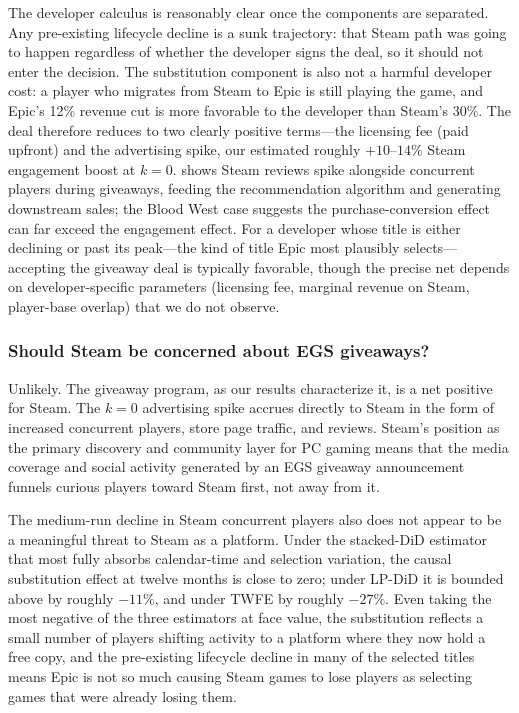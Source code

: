 \documentclass[11pt]{article}
\begin{document}
The developer calculus is reasonably clear once the components are separated.
Any pre-existing lifecycle decline is a sunk trajectory: that Steam path was
going to happen regardless of whether the developer signs the deal, so it
should not enter the decision. The substitution component is also not a
harmful developer cost: a player who migrates from Steam to Epic
is still playing the game, and Epic's 12\% revenue cut is more favorable to
the developer than Steam's 30\%. The deal therefore reduces to two clearly
positive terms---the licensing fee (paid upfront) and the advertising spike,
our estimated roughly $+10$--$14\%$ Steam engagement boost at $k = 0$. 
\citet{clarkson2025} shows Steam
reviews spike alongside concurrent players during giveaways, feeding the
recommendation algorithm and generating downstream sales; the Blood West case
\citep{frvr2026} suggests the purchase-conversion effect can far exceed the
engagement effect. For a developer whose title is either declining or past its
peak---the kind of title Epic most plausibly selects---accepting the giveaway
deal is typically favorable, though the precise net depends on developer-specific
parameters (licensing fee, marginal revenue on Steam, player-base overlap) that
we do not observe.

\subsubsection*{Should Steam be concerned about EGS giveaways?}

Unlikely. The giveaway program, as our results characterize it, is a net positive
for Steam. The $k = 0$ advertising spike accrues directly to Steam in the
form of increased concurrent players, store page traffic, and reviews. Steam's
position as the primary discovery and community layer for PC gaming means that
the media coverage and social activity generated by an EGS giveaway
announcement funnels curious players toward Steam first, not away from it.

The medium-run decline in Steam concurrent players also does not appear to be a
meaningful threat to Steam as a platform. Under the stacked-DiD estimator that
most fully absorbs calendar-time and selection variation, the causal substitution
effect at twelve months is close to zero; under LP-DiD it is bounded above by
roughly $-11\%$, and under TWFE by roughly $-27\%$. Even taking the most negative
of the three estimators at face value, the substitution reflects a small number
of players shifting activity to a platform where they now hold a free copy, and
the pre-existing lifecycle decline in many of the selected titles means Epic is
not so much causing Steam games to lose players as selecting games that were
already losing them.
\end{document}
